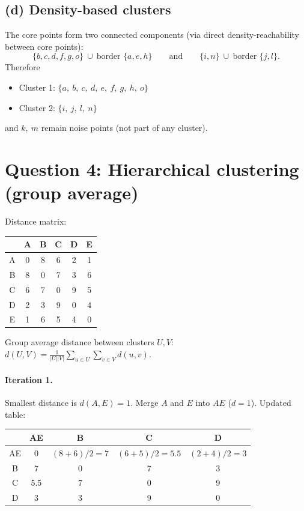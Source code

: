 \documentclass[11pt]{article}
\begin{document}
\subsection*{(d) Density-based clusters}

The core points form two connected components (via direct density-reachability between core
points):
\[
\{b,c,d,f,g,o\}\ \cup\ \text{border }\{a,e,h\}
\qquad\text{and}\qquad
\{i,n\}\ \cup\ \text{border }\{j,l\}.
\]
Therefore
\begin{itemize}
\item Cluster 1: $\boxed{\{a,\ b,\ c,\ d,\ e,\ f,\ g,\ h,\ o\}}$
\item Cluster 2: $\boxed{\{i,\ j,\ l,\ n\}}$
\end{itemize}
and $k,\ m$ remain noise points (not part of any cluster).

\section*{Question 4: Hierarchical clustering (group average)}

Distance matrix:

\begin{center}
\begin{tabular}{c|ccccc}
\toprule
& A & B & C & D & E\\
\midrule
A & 0 & 8 & 6 & 2 & 1\\
B & 8 & 0 & 7 & 3 & 6\\
C & 6 & 7 & 0 & 9 & 5\\
D & 2 & 3 & 9 & 0 & 4\\
E & 1 & 6 & 5 & 4 & 0\\
\bottomrule
\end{tabular}
\end{center}

Group average distance between clusters $U,V$:
$d(U,V)=\frac{1}{|U||V|}\sum_{u\in U}\sum_{v\in V} d(u,v)$.

\paragraph{Iteration 1.} Smallest distance is $d(A,E)=1$. Merge $A$ and $E$ into $AE$
($d=1$). Updated table:
\begin{center}
\begin{tabular}{c|cccc}
\toprule
& AE & B & C & D\\
\midrule
AE & 0 & $(8{+}6)/2=7$ & $(6{+}5)/2=5.5$ & $(2{+}4)/2=3$\\
B & 7 & 0 & 7 & 3\\
C & 5.5 & 7 & 0 & 9\\
D & 3 & 3 & 9 & 0\\
\bottomrule
\end{tabular}
\end{center}
\end{document}
